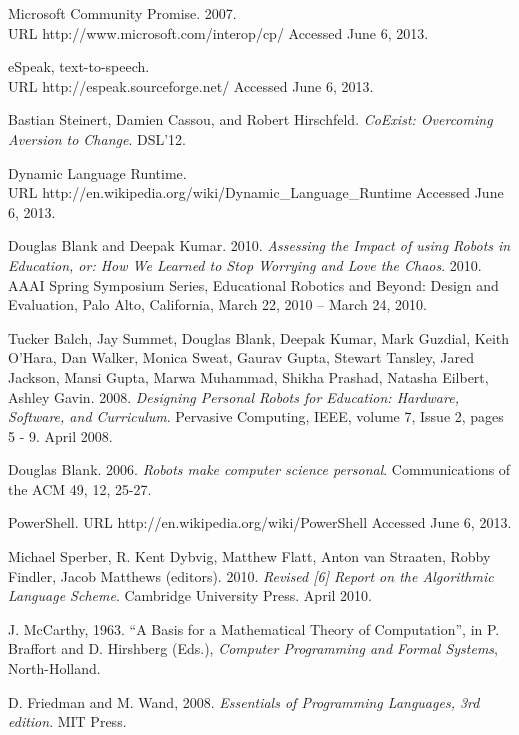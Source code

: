 \documentclass[preprint]{sigplanconf}
\begin{document}
\begin{thebibliography}{}
 Microsoft Community Promise. 2007.\\
URL http://www.microsoft.com/interop/cp/ Accessed June 6, 2013.

 eSpeak, text-to-speech.\\ URL http://espeak.sourceforge.net/ Accessed June 6, 2013.

 Bastian Steinert, Damien Cassou, and
  Robert Hirschfeld. \textit{CoExist: Overcoming Aversion to
    Change}. DSL'12.

 Dynamic Language Runtime.\\ URL
  http://en.wikipedia.org/wiki/Dynamic\_Language\_Runtime Accessed
  June 6, 2013.

 Douglas Blank and Deepak
  Kumar. 2010. \textit{Assessing the Impact of using Robots in
    Education, or: How We Learned to Stop Worrying and Love the
    Chaos}. 2010. AAAI Spring Symposium Series, Educational Robotics
  and Beyond: Design and Evaluation, Palo Alto, California, March 22,
  2010 – March 24, 2010.

 Tucker Balch, Jay Summet, Douglas Blank, Deepak Kumar,
  Mark Guzdial, Keith O'Hara, Dan Walker, Monica Sweat, Gaurav Gupta,
  Stewart Tansley, Jared Jackson, Mansi Gupta, Marwa Muhammad, Shikha
  Prashad, Natasha Eilbert, Ashley Gavin. 2008. \textit{Designing
    Personal Robots for Education: Hardware, Software, and
    Curriculum}. Pervasive Computing, IEEE, volume 7, Issue 2, pages 5
  - 9. April 2008.

 Douglas Blank. 2006. \textit{Robots make computer science
  personal}. Communications of the ACM 49, 12, 25-27.

 PowerShell. URL http://en.wikipedia.org/wiki/PowerShell Accessed June 6, 2013.

 Michael Sperber, R. Kent Dybvig, Matthew
  Flatt, Anton van Straaten, Robby Findler, Jacob Matthews
  (editors). 2010. \textit{Revised [6] Report on the Algorithmic Language
  Scheme}. Cambridge University Press. April 2010.

 J. McCarthy, 1963. ``A Basis for a Mathematical Theory
  of Computation'', in P. Braffort and D. Hirshberg (Eds.),
  \emph{Computer Programming and Formal Systems}, North-Holland.

 D. Friedman and M. Wand, 2008. \emph{Essentials of
  Programming Languages, 3rd edition}. MIT Press.

\end{thebibliography}
\end{document}
